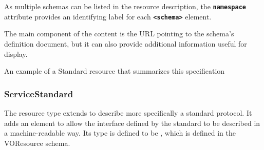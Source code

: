 \documentclass[11pt,a4paper]{ivoa}
\begin{document}

As multiple schemas can be listed in the resource description, the
\textbf{\texttt{namespace}} attribute provides an
identifying label for each \textbf{\texttt{<schema>}} 
element.


The main component of the 
content is the URL pointing to the schema's definition document, but
it can also provide additional information useful for display.

An example of a Standard resource that summarizes this specification




\subsubsection{ServiceStandard}

The  resource type extends
 to describe more
specifically a standard protocol.  It adds an 
 element to allow the interface defined
by the standard to be described in a machine-readable way.  Its type
is defined to be , which is defined in the
VOResource schema.
\end{document}
